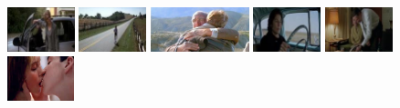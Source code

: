 \begin{figure}[!t]
\begin{center}
\includegraphics[height=1.3cm]{cvpr14_figures/dataset_thumb/hwd/class1.jpg} 
\includegraphics[height=1.3cm]{cvpr14_figures/dataset_thumb/hwd/class2.jpg} 
\includegraphics[height=1.3cm]{cvpr14_figures/dataset_thumb/hwd/class3.jpg}  
\includegraphics[height=1.3cm]{cvpr14_figures/dataset_thumb/hwd/class4.jpg}
\includegraphics[height=1.3cm]{cvpr14_figures/dataset_thumb/hwd/class5.jpg}
\includegraphics[height=1.3cm]{cvpr14_figures/dataset_thumb/hwd/class6.jpg} \\

\end{center}
\end{figure}
